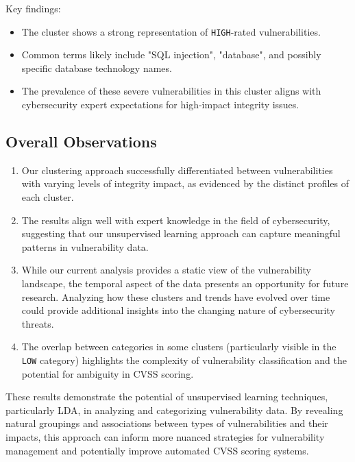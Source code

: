 Key findings:
\begin{itemize}
	\item The cluster shows a strong representation of \texttt{HIGH}-rated vulnerabilities.
	\item Common terms likely include "SQL injection", "database", and possibly specific database technology names.
	\item The prevalence of these severe vulnerabilities in this cluster aligns with cybersecurity expert expectations for high-impact integrity issues.
\end{itemize}

\subsection{Overall Observations}

\begin{enumerate}
	\item Our clustering approach successfully differentiated between vulnerabilities with varying levels of integrity impact, as evidenced by the distinct profiles of each cluster.

	\item The results align well with expert knowledge in the field of cybersecurity, suggesting that our unsupervised learning approach can capture meaningful patterns in vulnerability data.

	\item While our current analysis provides a static view of the vulnerability landscape, the temporal aspect of the data presents an opportunity for future research. Analyzing how these clusters and trends have evolved over time could provide additional insights into the changing nature of cybersecurity threats.

	\item The overlap between categories in some clusters (particularly visible in the \texttt{LOW} category) highlights the complexity of vulnerability classification and the potential for ambiguity in CVSS scoring.
\end{enumerate}

These results demonstrate the potential of unsupervised learning techniques, particularly LDA, in analyzing and categorizing vulnerability data. By revealing natural groupings and associations between types of vulnerabilities and their impacts, this approach can inform more nuanced strategies for vulnerability management and potentially improve automated CVSS scoring systems.

